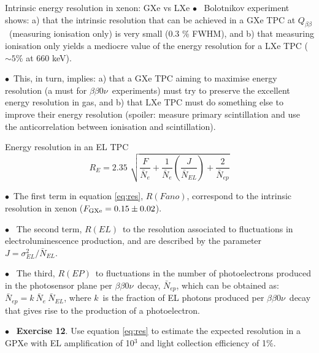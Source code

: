 \documentclass [aspectratio=169]{beamer}
\newcommand{\bbonu}{\ensuremath{\beta\beta0\nu}}
\newcommand{\qbb}{\ensuremath{Q_{\beta\beta}}}
\begin{document}
\begin{frame}{Intrinsic energy resolution in xenon: GXe vs LXe}
$\bullet$~ Bolotnikov experiment shows: a) that the intrinsic resolution that can be achieved in a GXe TPC at \qbb\ (measuring ionisation only) is very small (0.3 \% FWHM), and b) that measuring ionisation only yields a mediocre value of the energy resolution for a LXe TPC ($\sim 5$\% at 660 keV). 

$\bullet$~This, in turn, implies: a) that a GXe TPC aiming to maximise energy resolution (a must for \bbonu\ experiments) must try to preserve the excellent energy resolution in gas, and b) that LXe TPC must do something else to improve their energy resolution (spoiler: measure primary scintillation and use the anticorrelation between ionisation and scintillation).  
\end{frame}
%
\begin{frame}{Energy resolution in an EL TPC}
%
\begin{equation}
 R_E = 2.35 \, \, \sqrt{ \frac{F}{\bar{N}_e}
 + \frac{1}{\bar{N}_e} (\frac{J}{\bar{N}_{EL}}) + \frac{2}{\bar{N}_{ep}}}
 \label{eq:res}
 \end{equation}
%

$\bullet$~The first term in equation \ref{eq:res}, $R(Fano)$, correspond to the intrinsic resolution in xenon ($F_{\rm GXe} = 0.15 \pm 0.02$).

$\bullet$~ The second term, $R(EL)$~to the resolution associated to fluctuations in
electroluminescence production, and are described by the parameter $J = \sigma_{EL}^2/\bar{N}_{EL}$.

$\bullet$~ The third, $R(EP)$~to fluctuations in the number of photoelectrons produced in the photosensor plane per \bbonu\ decay, $\bar{N}_{ep}$, which can be obtained as:
$ \bar{N}_{ep} = k\ \bar{N}_e\ \bar{N}_{EL}$, 
%
where $k$~is the fraction of EL photons produced per \bbonu\ decay that gives rise to the production of a photoelectron. 

$\bullet$~ {\bf Exercise 12}. Use equation \ref{eq:res} to estimate the expected resolution in a GPXe with EL amplification of 10$^3$ and light collection efficiency of 1\%.

\end{frame}
\end{document}
